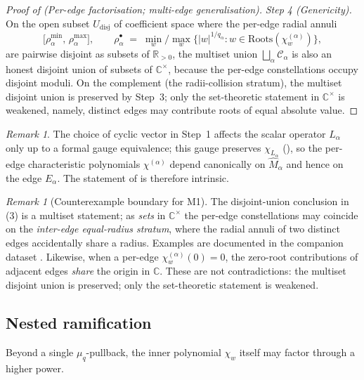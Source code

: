 \documentclass[11pt,a4paper]{article}
\theoremstyle{plain}
\theoremstyle{definition}
\theoremstyle{remark}
\newtheorem{remark}[theorem]{Remark}
\newcommand{\Roots}{\mathrm{Roots}}
\newcommand{\Cl}{\mathcal{C}}
\begin{document}
\begin{proof}[Proof of  (Per-edge factorisation; multi-edge
generalisation)]
\smallskip
\textit{Step 4 (Genericity).}
On the open subset $U_{\mathrm{disj}}$ of coefficient space where
the per-edge radial annuli
\[
   \big[\rho_\alpha^{\min},\, \rho_\alpha^{\max}\big],
   \qquad
   \rho_\alpha^{\bullet}
   \;=\;
   \min_w / \max_w\!\big\{|w|^{1/q_\alpha} : w \in
   \Roots(\chi_w^{(\alpha)})\big\},
\]
are pairwise disjoint as subsets of $\mathbb{R}_{> 0}$, the multiset
union $\bigsqcup_\alpha \Cl_\alpha$ is also an honest disjoint union
of subsets of $\mathbb{C}^\times$, because the per-edge constellations
occupy disjoint moduli. On the complement (the radii-collision
stratum), the multiset disjoint union is preserved by Step~3; only
the set-theoretic statement in $\mathbb{C}^\times$ is weakened,
namely, distinct edges may contribute roots of equal absolute value.
\end{proof}

\begin{remark}\label{rem:M1-cyclic-vector}
The choice of cyclic vector in Step~1 affects the scalar operator
$L_\alpha$ only up to a formal gauge equivalence; this gauge preserves
$\chi_{L_\alpha}$ (), so the per-edge
characteristic polynomials $\chi^{(\alpha)}$ depend canonically on
$\widehat{M}_\alpha$ and hence on the edge $E_\alpha$. The statement
of  is therefore intrinsic.
\end{remark}

\begin{remark}[Counterexample boundary for M1]\label{rem:M1-counter}
The disjoint-union conclusion in (3) is a multiset statement; as
\emph{sets} in $\mathbb{C}^\times$ the per-edge constellations may
coincide on the \emph{inter-edge equal-radius stratum}, where the
radial annuli of two distinct edges accidentally share a radius.
Examples are documented in the companion dataset \cite{wkb_dataset_v1}.
Likewise, when a per-edge $\chi_w^{(\alpha)}(0) = 0$, the zero-root
contributions of adjacent edges \emph{share} the origin in $\mathbb{C}$.
These are not contradictions: the multiset disjoint union is preserved;
only the set-theoretic statement is weakened.
\end{remark}

\subsection{Nested ramification}\label{ssec:N1}

Beyond a single $\mu_q$-pullback, the inner polynomial $\chi_w$ itself
may factor through a higher power.
\end{document}
